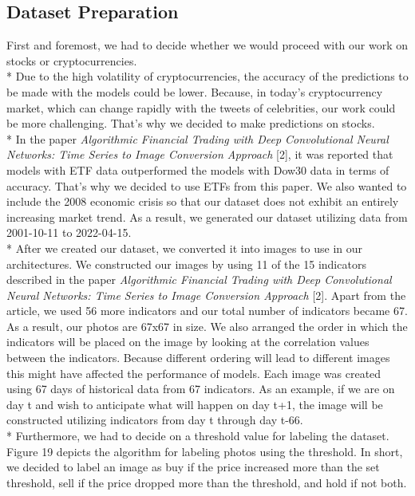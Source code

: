 \documentclass[]{article}
\begin{document}
\subsection{Dataset Preparation}
First and foremost, we had to decide whether we would proceed with our work on stocks or cryptocurrencies.\vspace{0.2cm}\\*
Due to the high volatility of cryptocurrencies, the accuracy of the predictions to be made with the models could be lower. Because, in today's cryptocurrency market, which can change rapidly with the tweets of celebrities, our work could be more challenging. That's why we decided to make predictions on stocks.\vspace{0.01cm} \\*
In the paper \textit{Algorithmic Financial Trading with Deep Convolutional Neural Networks: Time Series to Image Conversion Approach} [2], it was reported that models with ETF data outperformed the models with Dow30 data in terms of accuracy. That's why we decided to use ETFs from this paper. We also wanted to include the 2008 economic crisis so that our dataset does not exhibit an entirely increasing market trend. As a result, we generated our dataset utilizing data from 2001-10-11 to 2022-04-15.\vspace{0.1cm}\\*
After we created our dataset, we converted it into images to use in our architectures. We constructed our images by using 11 of the 15 indicators described in the paper \textit{Algorithmic Financial Trading with Deep Convolutional Neural Networks: Time Series to Image Conversion Approach} [2]. Apart from the article, we used 56 more indicators and our total number of indicators became 67. As a result, our photos are 67x67 in size.
We also arranged the order in which the indicators will be placed on the image by looking at the correlation values between the indicators. Because different ordering will lead to different images this might have affected the performance of models.
Each image was created using 67 days of historical data from 67 indicators. As an example, if we are on day t and wish to anticipate what will happen on day t+1, the image will be constructed utilizing indicators from day t through day t-66.\vspace{0.1cm}\\*
Furthermore, we had to decide on a threshold value for labeling the dataset. Figure 19 depicts the algorithm for labeling photos using the threshold. In short, we decided to label an image as buy if the price increased more than the set threshold, sell if the price dropped more than the threshold, and hold if not both.
\end{document}
